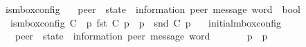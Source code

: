 \begin{isabellebody}
%
\endisatagproof
{\isafoldproof}%
%
\isadelimproof
%
\endisadelimproof
%
\isadelimdocument
%
\endisadelimdocument
%
\isatagdocument
%
\isamarkuptrue%
%
\isamarkuptrue%
%
\endisatagdocument
{\isafolddocument}%
%
\isadelimdocument
%
\endisadelimdocument
{}\isamarkupfalse%
\ is{\isacharunderscore}{\kern0pt}mbox{\isacharunderscore}{\kern0pt}config\isanewline
\ \ {\isacharcolon}{\kern0pt}{\isacharcolon}{\kern0pt}\ {\isachardoublequoteopen}{\isacharparenleft}{\kern0pt}{\isacharprime}{\kern0pt}peer\ {\isasymRightarrow}\ {\isacharparenleft}{\kern0pt}{\isacharprime}{\kern0pt}state\ {\isasymtimes}\ {\isacharparenleft}{\kern0pt}{\isacharprime}{\kern0pt}information{\isacharcomma}{\kern0pt}\ {\isacharprime}{\kern0pt}peer{\isacharparenright}{\kern0pt}\ message\ word{\isacharparenright}{\kern0pt}{\isacharparenright}{\kern0pt}\ {\isasymRightarrow}\ bool{\isachardoublequoteclose}\ \isanewline
\ \ {\isachardoublequoteopen}is{\isacharunderscore}{\kern0pt}mbox{\isacharunderscore}{\kern0pt}config\ C\ {\isasymequiv}\ {\isacharparenleft}{\kern0pt}{\isasymforall}p{\isachardot}{\kern0pt}\ fst\ {\isacharparenleft}{\kern0pt}C\ p{\isacharparenright}{\kern0pt}\ {\isasymin}\ {\isasymS}{\isacharparenleft}{\kern0pt}p{\isacharparenright}{\kern0pt}\ {\isasymand}\ snd\ {\isacharparenleft}{\kern0pt}C\ p{\isacharparenright}{\kern0pt}\ {\isasymin}\ {\isasymM}\isactrlsup {\isacharasterisk}{\kern0pt}{\isacharparenright}{\kern0pt}{\isachardoublequoteclose}\isanewline
\isanewline
{}\isamarkupfalse%
\ initial{\isacharunderscore}{\kern0pt}mbox{\isacharunderscore}{\kern0pt}config\isanewline
\ \ {\isacharcolon}{\kern0pt}{\isacharcolon}{\kern0pt}\ {\isachardoublequoteopen}{\isacharprime}{\kern0pt}peer\ {\isasymRightarrow}\ {\isacharparenleft}{\kern0pt}{\isacharprime}{\kern0pt}state\ {\isasymtimes}\ {\isacharparenleft}{\kern0pt}{\isacharprime}{\kern0pt}information{\isacharcomma}{\kern0pt}\ {\isacharprime}{\kern0pt}peer{\isacharparenright}{\kern0pt}\ message\ word{\isacharparenright}{\kern0pt}{\isachardoublequoteclose}\ \ {\isacharparenleft}{\kern0pt}{\isachardoublequoteopen}{\isasymC}\isactrlsub {\isasymI}\isactrlsub {\isasymmm}{\isachardoublequoteclose}{\isacharparenright}{\kern0pt}\ \isanewline
\ \ {\isachardoublequoteopen}{\isasymC}\isactrlsub {\isasymI}\isactrlsub {\isasymmm}\ {\isasymequiv}\ {\isasymlambda}p{\isachardot}{\kern0pt}\ {\isacharparenleft}{\kern0pt}{\isasymI}\ p{\isacharcomma}{\kern0pt}\ {\isasymepsilon}{\isacharparenright}{\kern0pt}{\isachardoublequoteclose}\isanewline

\end{isabellebody}
